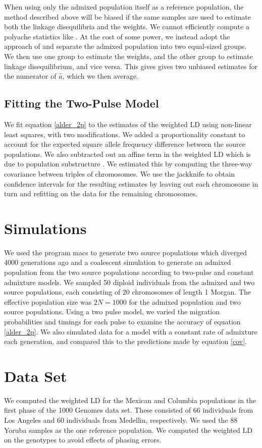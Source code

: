 When using only the admixed population itself as a reference population, the method described above will be biased if the same samples are used to estimate both the linkage disequilibria and the weights. We cannot efficiently compute a polyache statistics like \cite{loh2013inferring}. At the cost of some power, we instead adopt the approach of \cite{pickrell2012inference} and separate the admixed population into two equal-sized groups. We then use one group to estimate the weights, and the other group to estimate linkage disequilibrium, and vice versa. This gives gives two unbiased estimates for the numerator of $\hat{a}$, which we then average.
\subsection{Fitting the Two-Pulse Model}
We fit equation \ref{alder_2p} to the estimates of the weighted LD using non-linear least squares, with two modifications. We added a proportionality constant to account for the expected square allele frequency difference between the source populations. We also subtracted out an affine term in the weighted LD which is due to population substructure \cite{loh2013inferring}. We estimated this by computing the three-way covariance between triples of chromosomes. We use the jackknife to obtain confidence intervals for the resulting estimates by leaving out each chromosome in turn and refitting on the data for the remaining chromosomes.
\section{Simulations}
We used the program macs \cite{chen2009fast} to generate two source populations which diverged 4000 generations ago and a coalescent simulation to generate an admixed population from the two source populations according to two-pulse and constant admixture models. We sampled 50 diploid individuals from the admixed and two source populations, each consisting of 20 chromosomes of length 1 Morgan. The effective population size was $2N=1000$ for the admixed population and two source populations. Using a two pulse model, we varied the migration probabilities and timings for each pulse to examine the accuracy of equation \ref{alder_2p}. We also simulated data for a model with a constant rate of admixture each generation, and compared this to the predictions made by equation \ref{cov}.
\section{Data Set}
We computed the weighted LD for the Mexican and Columbia populations in the first phase of the 1000 Genomes data set. These consisted of 66 individuals from Los Angeles and 60 individuals from Medellin, respectively. We used the 88 Yoruba samples as the one reference population. We computed the weighted LD on the genotypes to avoid effects of phasing errors.
